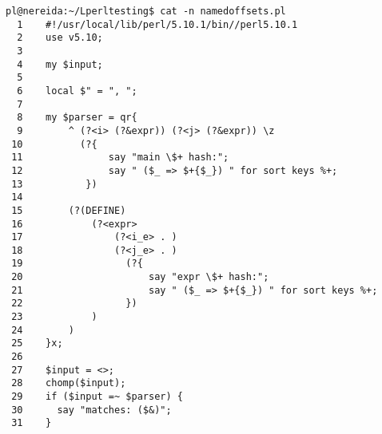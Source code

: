 \begin{latexonly}
\begin{verbatim}
pl@nereida:~/Lperltesting$ cat -n namedoffsets.pl
  1    #!/usr/local/lib/perl/5.10.1/bin//perl5.10.1
  2    use v5.10;
  3  
  4    my $input;
  5  
  6    local $" = ", ";
  7  
  8    my $parser = qr{
  9        ^ (?<i> (?&expr)) (?<j> (?&expr)) \z
 10          (?{
 11               say "main \$+ hash:";
 12               say " ($_ => $+{$_}) " for sort keys %+;
 13           })
 14  
 15        (?(DEFINE)
 16            (?<expr>
 17                (?<i_e> . )
 18                (?<j_e> . )
 19                  (?{
 20                      say "expr \$+ hash:";
 21                      say " ($_ => $+{$_}) " for sort keys %+;
 22                  })
 23            )
 24        )
 25    }x;
 26  
 27    $input = <>;
 28    chomp($input);
 29    if ($input =~ $parser) {
 30      say "matches: ($&)";
 31    }
\end{verbatim}
\end{latexonly}
